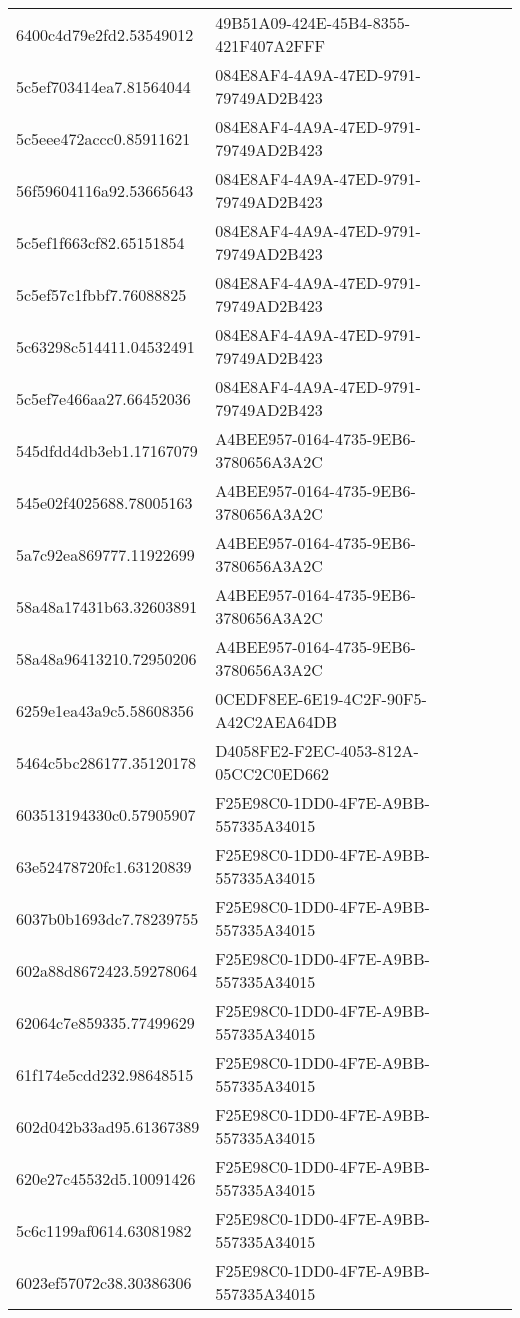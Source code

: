 \begin{tabular}{ll}
6400c4d79e2fd2.53549012 & 49B51A09-424E-45B4-8355-421F407A2FFF \\
5c5ef703414ea7.81564044 & 084E8AF4-4A9A-47ED-9791-79749AD2B423 \\
5c5eee472accc0.85911621 & 084E8AF4-4A9A-47ED-9791-79749AD2B423 \\
56f59604116a92.53665643 & 084E8AF4-4A9A-47ED-9791-79749AD2B423 \\
5c5ef1f663cf82.65151854 & 084E8AF4-4A9A-47ED-9791-79749AD2B423 \\
5c5ef57c1fbbf7.76088825 & 084E8AF4-4A9A-47ED-9791-79749AD2B423 \\
5c63298c514411.04532491 & 084E8AF4-4A9A-47ED-9791-79749AD2B423 \\
5c5ef7e466aa27.66452036 & 084E8AF4-4A9A-47ED-9791-79749AD2B423 \\
545dfdd4db3eb1.17167079 & A4BEE957-0164-4735-9EB6-3780656A3A2C \\
545e02f4025688.78005163 & A4BEE957-0164-4735-9EB6-3780656A3A2C \\
5a7c92ea869777.11922699 & A4BEE957-0164-4735-9EB6-3780656A3A2C \\
58a48a17431b63.32603891 & A4BEE957-0164-4735-9EB6-3780656A3A2C \\
58a48a96413210.72950206 & A4BEE957-0164-4735-9EB6-3780656A3A2C \\
6259e1ea43a9c5.58608356 & 0CEDF8EE-6E19-4C2F-90F5-A42C2AEA64DB \\
5464c5bc286177.35120178 & D4058FE2-F2EC-4053-812A-05CC2C0ED662 \\
603513194330c0.57905907 & F25E98C0-1DD0-4F7E-A9BB-557335A34015 \\
63e52478720fc1.63120839 & F25E98C0-1DD0-4F7E-A9BB-557335A34015 \\
6037b0b1693dc7.78239755 & F25E98C0-1DD0-4F7E-A9BB-557335A34015 \\
602a88d8672423.59278064 & F25E98C0-1DD0-4F7E-A9BB-557335A34015 \\
62064c7e859335.77499629 & F25E98C0-1DD0-4F7E-A9BB-557335A34015 \\
61f174e5cdd232.98648515 & F25E98C0-1DD0-4F7E-A9BB-557335A34015 \\
602d042b33ad95.61367389 & F25E98C0-1DD0-4F7E-A9BB-557335A34015 \\
620e27c45532d5.10091426 & F25E98C0-1DD0-4F7E-A9BB-557335A34015 \\
5c6c1199af0614.63081982 & F25E98C0-1DD0-4F7E-A9BB-557335A34015 \\
6023ef57072c38.30386306 & F25E98C0-1DD0-4F7E-A9BB-557335A34015 \\

\end{tabular}
